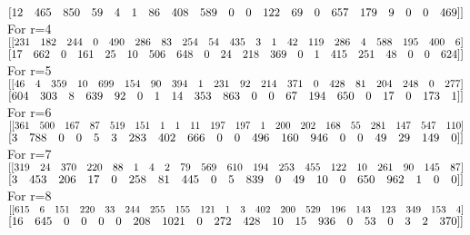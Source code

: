 \documentclass{article}
\begin{document}
$[ 12\quad 465\quad 850\quad  59\quad   4  \quad 1 \quad 86 \quad408\quad 589 \quad  0 \quad  0\quad 122 \quad 69  \quad 0\quad 657\quad 179 \quad  9 \quad  0\quad0 \quad469]]\\$
For r=4\\
$[[231\quad 182\quad 244\quad   0\quad 490\quad 286 \quad 83\quad 254\quad  54\quad 435 \quad  3  \quad 1\quad 42\quad119\quad286\quad   4\quad588\quad 195\quad 400\quad   6]\\$
$[ 17\quad662 \quad  0\quad 161\quad  25 \quad 10\quad 506\quad 648 \quad  0\quad  24\quad 218 \quad369 \quad  0 \quad  1\quad 415\quad 251 \quad 48 \quad  0\quad 0\quad 624]]\\$
For r=5\\
$[[ 46 \quad  4 \quad359 \quad 10\quad 699 \quad154 \quad 90\quad 394 \quad  1 \quad231\quad  92\quad 214\quad 371 \quad  0\quad 428 \quad 81\quad 204\quad 248\quad 0 \quad277]\\$
$[604\quad 303\quad   8 \quad639\quad 92 \quad  0 \quad  1\quad  14\quad 353\quad 863\quad   0 \quad  0\quad  67\quad 194\quad 650 \quad  0 \quad 17 \quad  0\quad 173\quad   1]]\\$
For r=6\\
$[[361\quad 500\quad 167 \quad 87 \quad519 \quad151  \quad 1  \quad 1 \quad 11 \quad197 \quad197  \quad 1\quad 200\quad 202\quad 168 \quad 55\quad 281\quad 147 \quad547\quad110]\\$
$[  3 \quad788  \quad 0  \quad 0\quad   5 \quad  3\quad 283\quad 402 \quad666 \quad  0  \quad 0\quad 496\quad 160 \quad946 \quad 0 \quad  0 \quad 49\quad  29\quad 149 \quad  0]]\\$
For r=7\\
$[[319\quad  24\quad 370\quad 220\quad  88 \quad  1 \quad  4  \quad 2\quad  79\quad 569 \quad610\quad 194\quad 253\quad 455\quad 122\quad  10\quad 261 \quad 90\quad 145\quad  87]\\$
$[  3 \quad453\quad 206 \quad 17\quad   0\quad 258\quad  81\quad 445 \quad  0\quad   5\quad 839 \quad  0\quad  49 \quad 10  \quad 0 \quad650\quad 962\quad   1\quad 0 \quad  0]]\\$
For r=8\\
$[[ 615  \quad  6 \quad 151\quad  220\quad   33 \quad 244 \quad 255\quad  155\quad  121\quad    1  \quad  3 \quad 402\quad  200\quad  529\quad 196\quad  143 \quad 123 \quad 349 \quad 153 \quad   4]\\$
$[  16\quad  645  \quad  0  \quad  0 \quad   0\quad    0\quad  208\quad 1021 \quad   0 \quad 272\quad  428\quad   10 \quad  15\quad  936\quad 0 \quad  53\quad    0 \quad   3   \quad 2  \quad370]]\\$
\end{document}
